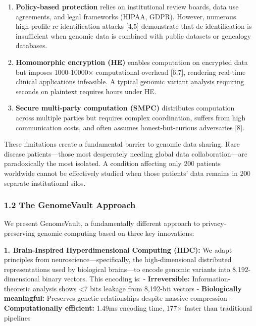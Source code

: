 \documentclass[
  11pt,
]{article}
\begin{document}
\begin{enumerate}
\def\labelenumi{\arabic{enumi}.}
\item
  \textbf{Policy-based protection} relies on institutional review
  boards, data use agreements, and legal frameworks (HIPAA, GDPR).
  However, numerous high-profile re-identification attacks {[}4,5{]}
  demonstrate that de-identification is insufficient when genomic data
  is combined with public datasets or genealogy databases.
\item
  \textbf{Homomorphic encryption (HE)} enables computation on encrypted
  data but imposes 1000-10000× computational overhead {[}6,7{]},
  rendering real-time clinical applications infeasible. A typical
  genomic variant analysis requiring seconds on plaintext requires hours
  under HE.
\item
  \textbf{Secure multi-party computation (SMPC)} distributes computation
  across multiple parties but requires complex coordination, suffers
  from high communication costs, and often assumes honest-but-curious
  adversaries {[}8{]}.
\end{enumerate}

These limitations create a fundamental barrier to genomic data sharing.
Rare disease patients---those most desperately needing global data
collaboration---are paradoxically the most isolated. A condition
affecting only 200 patients worldwide cannot be effectively studied when
those patients' data remains in 200 separate institutional silos.

\subsubsection{1.2 The GenomeVault
Approach}\label{the-genomevault-approach}

We present GenomeVault, a fundamentally different approach to
privacy-preserving genomic computing based on three key innovations:

\textbf{1. Brain-Inspired Hyperdimensional Computing (HDC):} We adapt
principles from neuroscience---specifically, the high-dimensional
distributed representations used by biological brains---to encode
genomic variants into 8,192-dimensional binary vectors. This encoding
is: - \textbf{Irreversible:} Information-theoretic analysis shows
\textless7 bits leakage from 8,192-bit vectors - \textbf{Biologically
meaningful:} Preserves genetic relationships despite massive compression
- \textbf{Computationally efficient:} 1.49ms encoding time, 177× faster
than traditional pipelines
\end{document}
